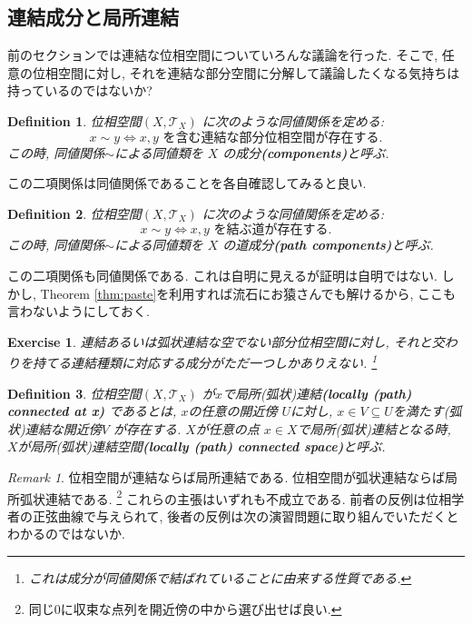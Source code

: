 \documentclass[dvipdfmx]{jbook}
\newtheorem{definition}{Definition}[section]
\theoremstyle{remark}
\newtheorem{remark}{Remark}[section]
\theoremstyle{plain}
\newtheorem{exercise}{Exercise}[section]
\begin{document}
\subsection{連結成分と局所連結}

前のセクションでは連結な位相空間についていろんな議論を行った. 
そこで, 任意の位相空間に対し, それを連結な部分空間に分解して議論したくなる気持ちは持っているのではないか?

\begin{definition}
	位相空間$\left( X , \mathcal{T}_{X} \right)$ に次のような同値関係を定める:\\
	$$x \sim y \iff \text{$x,y$ を含む連結な部分位相空間が存在する.}$$
	この時, 同値関係$\sim$による同値類を $X$ の成分\textbf{(components)}と呼ぶ.
\end{definition}

この二項関係は同値関係であることを各自確認してみると良い.

\begin{definition}
	位相空間$\left( X , \mathcal{T}_{X} \right)$ に次のような同値関係を定める:\\
	$$x \sim y \iff \text{$x,y$ を結ぶ道が存在する.}$$
	この時, 同値関係$\sim$による同値類を $X$ の道成分\textbf{(path components)}と呼ぶ.
\end{definition}

この二項関係も同値関係である. これは自明に見えるが証明は自明ではない.
しかし, Theorem \ref{thm:paste}を利用すれば流石にお猿さんでも解けるから, ここも言わないようにしておく.

\begin{exercise}
	連結あるいは弧状連結な空でない部分位相空間に対し, それと交わりを持てる連結種類に対応する成分がただ一つしかありえない. \footnote{これは成分が同値関係で結ばれていることに由来する性質である.}
\end{exercise}

\begin{definition}
	位相空間$\left( X , \mathcal{T}_{X} \right)$ が$x$で局所(弧状)連結\textbf{(locally (path) connected at x)}
	であるとは, $x$の任意の開近傍 $U$に対し, $x \in V \subseteq U$を満たす(弧状)連結な開近傍$V$ が存在する. 
	$X$が任意の点 $x \in X$で局所(弧状)連結となる時,  $X$が局所(弧状)連結空間\textbf{(locally (path) connected space)}と呼ぶ.
\end{definition}

\begin{remark}
	位相空間が連結ならば局所連結である. 位相空間が弧状連結ならば局所弧状連結である. \footnote{同じ$0$に収束な点列を開近傍の中から選び出せば良い.}
	これらの主張はいずれも不成立である. 前者の反例は位相学者の正弦曲線で与えられて, 後者の反例は次の演習問題に取り組んでいただくとわかるのではないか. 
\end{remark}
\end{document}

